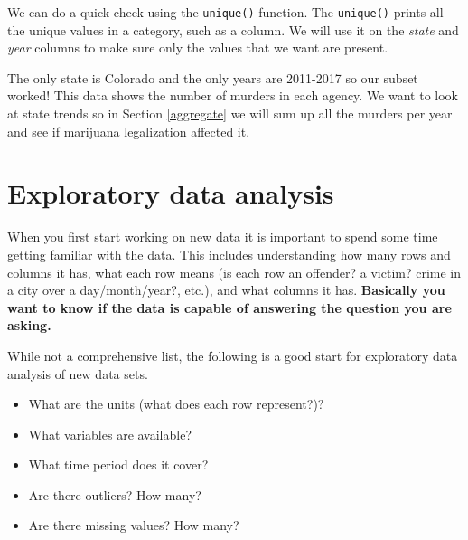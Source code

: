 \documentclass[
  12pt,
]{book}
\newenvironment{Shaded}{\begin{snugshade}}{\end{snugshade}}
\newcommand{\CommentTok}[1]{\textcolor[rgb]{0.37,0.37,0.37}{\textit{#1}}}
\newcommand{\KeywordTok}[1]{\textcolor[rgb]{0.27,0.27,0.27}{\textbf{#1}}}
\newcommand{\NormalTok}[1]{#1}
\newcommand{\OperatorTok}[1]{\textcolor[rgb]{0.43,0.43,0.43}{\textbf{#1}}}
\providecommand{\tightlist}{%
  \setlength{\itemsep}{0pt}\setlength{\parskip}{0pt}}
\begin{document}
We can do a quick check using the \texttt{unique()} function. The \texttt{unique()} prints all the unique values in a category, such as a column. We will use it on the \emph{state} and \emph{year} columns to make sure only the values that we want are present.

\begin{Shaded}
\end{Shaded}

\begin{Shaded}
\end{Shaded}

The only state is Colorado and the only years are 2011-2017 so our subset worked! This data shows the number of murders in each agency. We want to look at state trends so in Section \ref{aggregate} we will sum up all the murders per year and see if marijuana legalization affected it.

\hypertarget{explore}{%
\chapter{Exploratory data analysis}\label{explore}}

When you first start working on new data it is important to spend some time getting familiar with the data. This includes understanding how many rows and columns it has, what each row means (is each row an offender? a victim? crime in a city over a day/month/year?, etc.), and what columns it has. \textbf{Basically you want to know if the data is capable of answering the question you are asking.}

While not a comprehensive list, the following is a good start for exploratory data analysis of new data sets.

\begin{itemize}
\tightlist
\item
  What are the units (what does each row represent?)?
\item
  What variables are available?
\item
  What time period does it cover?
\item
  Are there outliers? How many?
\item
  Are there missing values? How many?
\end{itemize}
\end{document}

